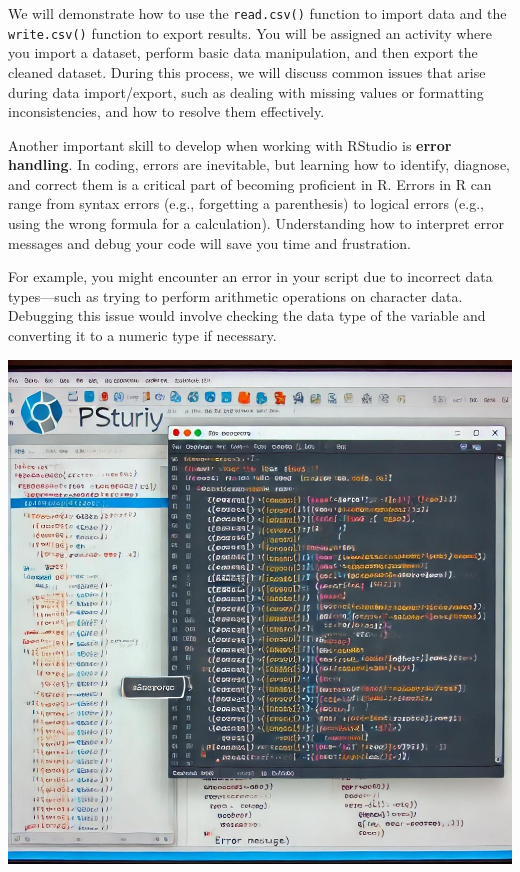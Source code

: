 \documentclass[
]{book}
\begin{document}
We will demonstrate how to use the \texttt{read.csv()} function to import data and the \texttt{write.csv()} function to export results. You will be assigned an activity where you import a dataset, perform basic data manipulation, and then export the cleaned dataset. During this process, we will discuss common issues that arise during data import/export, such as dealing with missing values or formatting inconsistencies, and how to resolve them effectively.

Another important skill to develop when working with RStudio is \textbf{error handling}. In coding, errors are inevitable, but learning how to identify, diagnose, and correct them is a critical part of becoming proficient in R. Errors in R can range from syntax errors (e.g., forgetting a parenthesis) to logical errors (e.g., using the wrong formula for a calculation). Understanding how to interpret error messages and debug your code will save you time and frustration.

For example, you might encounter an error in your script due to incorrect data types---such as trying to perform arithmetic operations on character data. Debugging this issue would involve checking the data type of the variable and converting it to a numeric type if necessary.

\includegraphics[width=1\textwidth,height=\textheight]{images/fig070.jpg}
\end{document}
